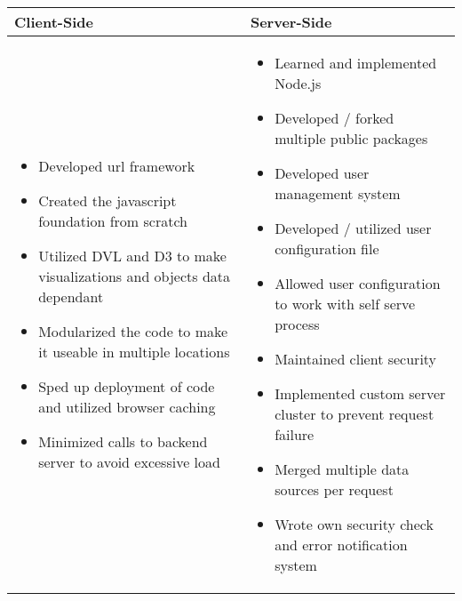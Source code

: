 \documentclass[oneside]{article}
\begin{document}
    \begin{tabular}{p{6.25cm} p{9.25cm}}
      {\bf Client-Side} & {\bf Server-Side} \\
      \hline
      \begin{itemize}
        \item Developed url framework
        \item Created the javascript foundation from scratch
        \item Utilized DVL and D3 to make visualizations and objects data dependant
        \item Modularized the code to make it useable in multiple locations
        \item Sped up deployment of code and utilized browser caching
        \item Minimized calls to backend server to avoid excessive load
      \end{itemize} &
      \begin{itemize}
        \item Learned and implemented Node.js
        \item Developed / forked multiple public packages
        \item Developed user management system
        \item Developed / utilized user configuration file
        \item Allowed user configuration to work with self serve process
        \item Maintained client security
        \item Implemented custom server cluster to prevent request failure
        \item Merged multiple data sources per request
        \item Wrote own security check and error notification system
      \end{itemize}
    \end{tabular}
\end{document}

